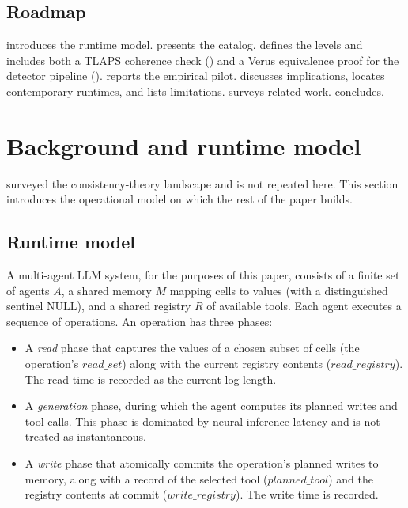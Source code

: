 \documentclass[journal,compsoc,10pt]{IEEEtran}
\theoremstyle{definition}
\theoremstyle{remark}
\newcommand{\fld}[1]{\mathit{#1}}
\newcommand{\rs}{\fld{read\_set}}
\newcommand{\rreg}{\fld{read\_registry}}
\newcommand{\wreg}{\fld{write\_registry}}
\newcommand{\pt}{\fld{planned\_tool}}
\begin{document}
\subsection{Roadmap}
 introduces the runtime model.
 presents the catalog. 
defines the levels and includes both a TLAPS coherence check
() and a Verus equivalence proof for the
detector pipeline ().
 reports the empirical pilot.
 discusses implications, locates contemporary
runtimes, and lists limitations.  surveys related
work.  concludes.

\section{Background and runtime model}
\label{sec:background}

 surveyed the consistency-theory landscape
and is not repeated here. This section introduces the operational model
on which the rest of the paper builds.

\subsection{Runtime model}
\label{sec:runtime-model}
A multi-agent LLM system, for the purposes of this paper, consists of
a finite set of agents $A$, a shared memory $M$ mapping cells to values
(with a distinguished sentinel $\mathrm{NULL}$), and a shared registry
$R$ of available tools. Each agent executes a sequence of operations.
An operation has three phases:

\begin{itemize}
\item A \emph{read} phase that captures the values of a chosen subset
of cells (the operation's $\rs$) along with the current registry
contents ($\rreg$). The read time is recorded as the current log
length.
\item A \emph{generation} phase, during which the agent computes its
planned writes and tool calls. This phase is dominated by
neural-inference latency and is not treated as instantaneous.
\item A \emph{write} phase that atomically commits the operation's
planned writes to memory, along with a record of the selected tool
($\pt$) and the registry contents at commit ($\wreg$). The write time
is recorded.
\end{itemize}
\end{document}
